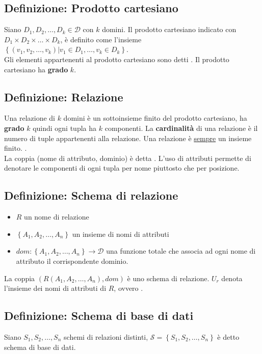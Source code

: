 \documentclass[12pt, a4paper]{report}
\begin{document}
            \subsection{Definizione: Prodotto cartesiano}
                Siano $D_{1},D_{2},\ldots,D_{k} \in \mathcal{D} \text{ con } k$ domini. Il prodotto cartesiano indicato con $D_{1}\times D_{2}\times \ldots \times D_{k}$, è definito come l'insieme $\left\{\left(v_{1},v_{2},\ldots,v_{k}\right)|v_{1}\in D_{1},\ldots,v_{k}\in D_{k}\right\}$.\\
                Gli elementi appartenenti al prodotto cartesiano sono detti . Il prodotto cartesiano ha \textbf{grado} $k$.
            \subsection{Definizione: Relazione}
                Una relazione di $k$ domini è un sottoinsieme finito del prodotto cartesiano, ha \textbf{grado} $k$ quindi ogni tupla ha $k$ componenti. La \textbf{cardinalità} di una relazione è il numero di tuple appartenenti alla relazione. Una relazione è \underline{sempre} un insieme finito. .\\
            La coppia (nome di attributo, dominio) è detta . L'uso di attributi permette di denotare le componenti di ogni tupla per nome piuttosto che per posizione.
            \subsection{Definizione: Schema di relazione}
                \begin{itemize}
                    \item $R$ un nome di relazione
                    \item $\left\{A_{1},A_{2},\ldots,A_{n}\right\}$ un insieme di nomi di attributi
                    \item $dom:\left\{A_{1},A_{2},\ldots,A_{n}\right\}\rightarrow \mathcal{D}$ una funzione totale che associa ad ogni nome di attributo il corrispondente dominio.
                \end{itemize}
                La coppia $(R(A_{1},A_{2},\ldots,A_{n}),dom)$ è uno schema di relazione. $U_{r}$ denota l'insieme dei nomi di attributi di $R$, ovvero .
            \subsection{Definizione: Schema di base di dati}
                Siano $S_{1},S_{2},\ldots,S_{n}$ schemi di relazioni distinti, $\mathcal{S}=\left\{S_{1},S_{2},\ldots,S_{n}\right\}$ è detto schema di base di dati.
\end{document}
